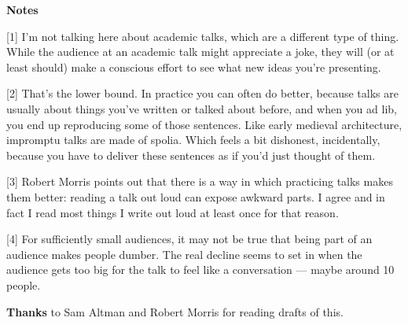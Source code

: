 \textbf{Notes}

[1]
I'm not talking here about academic talks, which are a 
different type of thing.  While the
audience at an academic talk might appreciate a joke, they will (or
at least should) make a conscious effort to see what new ideas
you're presenting.

[2]
That's the lower bound.  In practice you can often do better,
because talks are usually about things you've written or talked
about before, and when you ad lib, you end up reproducing some of
those sentences.  Like early medieval architecture, impromptu talks
are made of spolia.  Which feels a bit dishonest, incidentally,
because you have to deliver these sentences as if you'd just thought
of them.

[3]
Robert Morris points out that there is a way in which practicing
talks makes them better: reading a talk out loud can expose awkward
parts.  I agree and in fact I read most things I write out loud at
least once for that reason.

[4]
For sufficiently small audiences, it may not be true that being
part of an audience makes people dumber.  The real decline seems
to set in when the audience gets too big for the talk to feel like
a conversation --- maybe around 10 people.


\textbf{Thanks} to Sam Altman and Robert Morris for reading drafts
of this.




